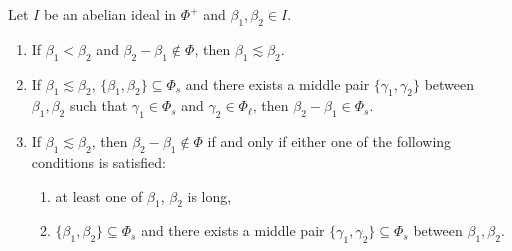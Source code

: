 \documentclass[ALCO,published]{cedram}
\theoremstyle{plain}
\newcommand\be{\beta}
\newcommand\ga{\gamma}
\begin{document}
\begin{pro}\label{pro:minori-crossing}
Let $I$ be an abelian ideal in $\Phi^+$ and $\be_1, \be_2\in I$. 
\begin{enumerate}
\item 
If $\be_1<\be_2$ and $\be_2-\be_1\not\in\Phi$, then $\be_1\lesssim\be_2$.
\label{itm:nonroot-then-sim}
\item 
If $\be_1\lesssim\be_2$, $\{\be_1, \be_2\}\subseteq\Phi_s$ and there exists a middle pair $\{\ga_1, \ga_2\}$ between $\be_1, \be_2$ such that $\ga_1\in\Phi_s$ and $\ga_2\in\Phi_\ell$, then $\be_2-\be_1\in\Phi_s$.
\label{itm:sim-then-root}
\item
If $\be_1\lesssim\be_2$, then  $\be_2-\be_1\not\in\Phi$ if and only if either one of the following conditions is satisfied:
\begin{enumerate}[label=\textup{(\alph*)}]
\item at least one of $\be_1$, $\be_2$ is long,
\item $\{\be_1, \be_2\}\subseteq\Phi_s$ and there exists  a middle pair $\{\ga_1, \ga_2\}\subseteq\Phi_s$ between $\be_1, \be_2$.
\end{enumerate}
\label{itm:sim-then-nonroot}
\end{enumerate}
\end{pro}
\end{document}
